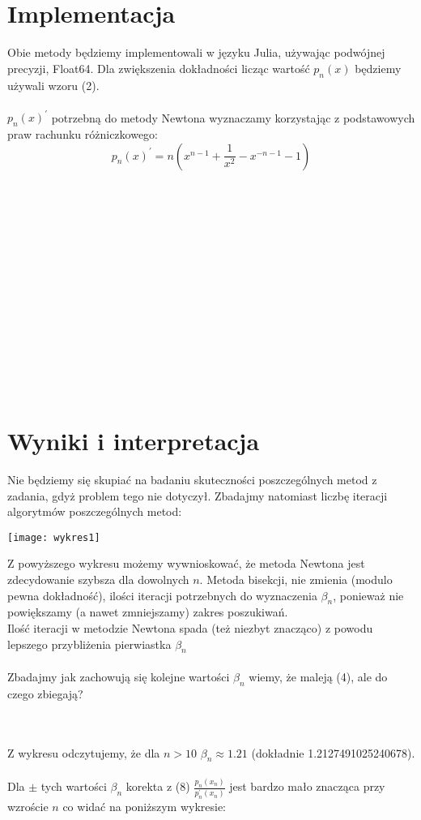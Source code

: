 \documentclass{article}
\begin{document}
\section{Implementacja}
Obie metody będziemy implementowali w języku Julia, używając podwójnej precyzji, Float64.
Dla zwiększenia dokładności licząc wartość $p_n(x)$ będziemy używali wzoru (2).\\\\
$p_n(x)^\prime$ potrzebną do metody Newtona wyznaczamy korzystając z podstawowych praw rachunku różniczkowego:
\begin{equation}
p_n(x)^\prime = n ( x^{n-1} + \frac{1}{x^2} - x^{-n - 1} -1)
\end{equation}
\\\\\\\\\\\\\\\\\\\\\\\\\\\\

\section{Wyniki i interpretacja}
Nie będziemy się skupiać na badaniu skuteczności poszczególnych metod z zadania, gdyż problem tego nie dotyczył. Zbadajmy natomiast liczbę iteracji algorytmów poszczególnych metod:

\texttt{[image: wykres1]}

Z powyższego wykresu możemy wywnioskować, że metoda Newtona jest zdecydowanie szybsza dla dowolnych $n$. Metoda bisekcji, nie zmienia (modulo pewna dokładność), ilości iteracji potrzebnych do wyznaczenia $\beta_n$, ponieważ nie powiększamy (a nawet zmniejszamy) zakres poszukiwań.\\
Ilość iteracji w metodzie Newtona spada (też niezbyt znacząco) z powodu lepszego przybliżenia pierwiastka $\beta_n$\\\\
Zbadajmy jak zachowują się kolejne wartości $\beta_n$ wiemy, że maleją (4), ale do czego zbiegają?
\begin{figure}[b!]
  \centering
  \hfill
\end{figure}
\\\\Z wykresu odczytujemy, że dla $n > 10$ $\beta_n \approx 1.21$ (dokładnie 1.2127491025240678).\\\\
Dla $\pm$ tych wartości $\beta_n$ korekta z (8) $\frac{p_n(x_n)}{p_n^\prime(x_n)}$ jest bardzo mało znacząca przy wzroście $n$ co widać na poniższym wykresie:\\\\
\end{document}
